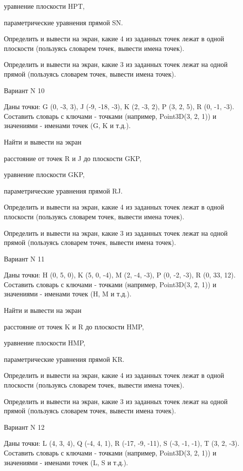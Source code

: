 \documentclass[11pt]{report}
\begin{document}
 
уравнение плоскости HPT,

 
параметрические уравнения прямой SN.


Определить и вывести на экран, какие 4 из заданных точек лежат в одной плоскости (пользуясь словарем точек, вывести имена точек).


Определить и вывести на экран, какие 3 из заданных точек лежат на одной прямой (пользуясь словарем точек, вывести имена точек).

Вариант N 10

Даны точки: G (0, -3, 3), J (-9, -18, -3), K (2, -3, 2), P (3, 2, 5), R (0, -1, -3).
Составить словарь с ключами - точками (например, Point3D(3, 2, 1)) и значениями - именами точек (G, K и т.д.).

 
Найти и вывести на экран


расстояние от точек R и J до плоскости GKP,

 
уравнение плоскости GKP,

 
параметрические уравнения прямой RJ.


Определить и вывести на экран, какие 4 из заданных точек лежат в одной плоскости (пользуясь словарем точек, вывести имена точек).


Определить и вывести на экран, какие 3 из заданных точек лежат на одной прямой (пользуясь словарем точек, вывести имена точек).

Вариант N 11

Даны точки: H (0, 5, 0), K (5, 0, -4), M (2, -4, -3), P (0, -2, -3), R (0, 33, 12).
Составить словарь с ключами - точками (например, Point3D(3, 2, 1)) и значениями - именами точек (H, M и т.д.).

 
Найти и вывести на экран


расстояние от точек K и R до плоскости HMP,

 
уравнение плоскости HMP,

 
параметрические уравнения прямой KR.


Определить и вывести на экран, какие 4 из заданных точек лежат в одной плоскости (пользуясь словарем точек, вывести имена точек).


Определить и вывести на экран, какие 3 из заданных точек лежат на одной прямой (пользуясь словарем точек, вывести имена точек).

Вариант N 12

Даны точки: L (4, 3, 4), Q (-4, 4, 1), R (-17, -9, -11), S (-3, -1, -1), T (3, 2, -3).
Составить словарь с ключами - точками (например, Point3D(3, 2, 1)) и значениями - именами точек (L, S и т.д.).
\end{document}
